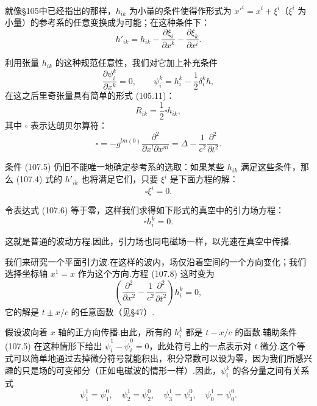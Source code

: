就像§105中已经指出的那样，$h_{ik}$ 为小量的条件使得作形式为 $x'^i=x^i+\xi^i$（$\xi^i$ 为小量）的参考系的任意变换成为可能；在这种条件下：
\begin{equation}
  h'_{ik}=h_{ik}
  -\frac{\partial\xi_i}{\partial x^{k}}
  -\frac{\partial\xi_k}{\partial x^{i}}.
\end{equation}

利用张量 $h_{ik}$ 的这种规范任意性，我们对它加上补充条件
\begin{equation}
  \frac{\partial\psi_i^k}{\partial x^{k}}=0,
  \qquad
  \psi_i^k=h_i^k-\frac{1}{2}\delta_i^kh,
\end{equation}
在这之后里奇张量具有简单的形式 (105.11)：
\begin{equation}
  R_{ik}=\frac{1}{2}\square h_{ik},
\end{equation}
其中 $\square$ 表示达朗贝尔算符：
\begin{equation*}
  \square=-g^{lm(0)}
  \frac{\partial^{2}}{\partial x^{l}\partial x^{m}}
  =\Delta-\frac{1}{c^{2}}\frac{\partial^{2}}{\partial t^{2}}.
\end{equation*}

条件 (107.5) 仍旧不能唯一地确定参考系的选取：如果某些 $h_{ik}$ 满足这些条件，那么 (107.4) 式的 $h'_{ik}$ 也将满足它们，只要 $\xi^i$ 是下面方程的解：
\begin{equation}
  \square\xi^i=0.
\end{equation}

令表达式 (107.6) 等于零，这样我们求得如下形式的真空中的引力场方程：
\begin{equation}
  \square h_i^k=0.
\end{equation}

这就是普通的波动方程.因此，引力场也同电磁场一样，以光速在真空中传播.

我们来研究一个平面引力波.在这样的波内，场仅沿着空间的一个方向变化；我们选择坐标轴 $x^{1}=x$ 作为这个方向.方程 (107.8) 这时变为
\begin{equation}
  \left(\frac{\partial^{2}}{\partial x^{2}}
  -\frac{1}{c^{2}}\frac{\partial^{2}}{\partial t^{2}}\right)h_i^k=0,
\end{equation}
它的解是 $t\pm x/c$ 的任意函数（见§47）.

假设波向着 $x$ 轴的正方向传播.由此，所有的 $h_i^k$ 都是 $t-x/c$ 的函数.辅助条件 (107.5) 在这种情形下给出 $\dot{\psi}_i^1-\dot{\psi}_i^0=0$，此处符号上的一点表示对 $t$ 微分.这个等式可以简单地通过去掉微分符号就能积出，积分常数可以设为零，因为我们所感兴趣的只是场的可变部分（正如电磁波的情形一样）.因此，$\psi_i^k$ 的各分量之间有关系式
\begin{equation}
  \psi_1^1=\psi_1^0,\quad
  \psi_2^1=\psi_2^0,\quad
  \psi_3^1=\psi_3^0,\quad
  \psi_0^1=\psi_0^0.
\end{equation}

